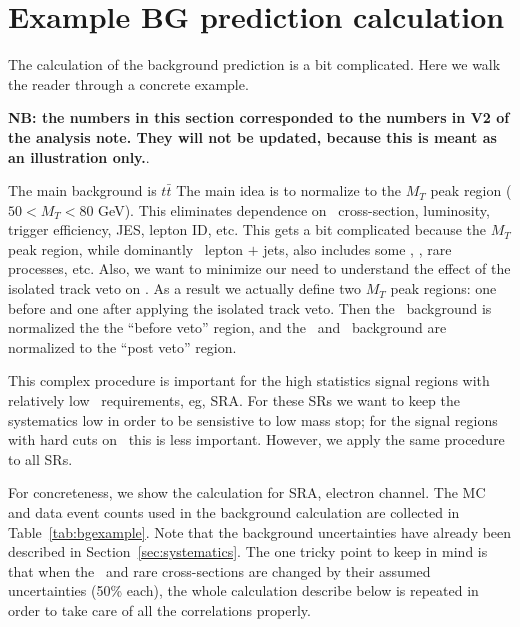 \section{Example BG prediction calculation}
\label{BGexample}

The calculation of the background prediction is a bit complicated.
Here we walk the reader through a concrete example. 

 {\bf NB: the numbers
in this section corresponded to the numbers in V2 of the analysis note. 
They will not be updated, because this is meant as an illustration only.}.

The main background is $t\bar{t}$
The main idea is to normalize to the $M_T$ peak region ($50 < M_T < 80$ GeV).
This eliminates dependence on \ttbar\ cross-section, luminosity,
trigger efficiency, JES, lepton ID, etc.  This gets a bit complicated because
the $M_T$ peak region, while dominantly \ttbar\ lepton $+$ jets,
also includes some \wjets, \ttdl, rare processes, etc.  Also, we want
to minimize our need to understand the effect of the isolated 
track veto on \ttsl.  As a result we actually define two $M_T$ peak
regions: one before and one after applying the isolated track veto.
Then the \ttdl\ background is normalized the the ``before veto'' region,
and the \ttsl\ and \wjets\ background are normalized to the ``post veto''
region.

This complex procedure is important for the high statistics signal regions 
with relatively low \met\ requirements, eg, SRA.  For these SRs we want to keep the 
systematics low in order to be sensistive to low mass stop; for the signal regions
with hard cuts on \met\, this is less important.  However, we apply the same 
procedure to all SRs.

For concreteness, we show the calculation for SRA, electron channel.  The MC and data
event counts used in the background calculation are collected in Table~\ref{tab:bgexample}.
Note that the background uncertainties have already been described 
in Section~\ref{sec:systematics}.  The one tricky point to keep in mind is that 
when the \wjets\ and rare cross-sections are changed by their assumed uncertainties
(50\% each), the whole calculation describe below is repeated in order to take care
of all the correlations properly.


